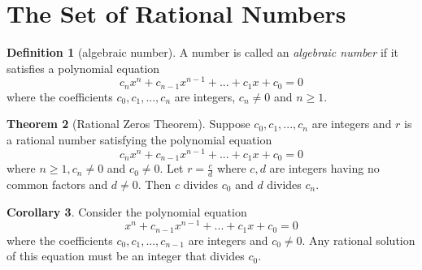 \documentclass{book}
\theoremstyle{definition}
\newtheorem{definition}{Definition}[section]
\newtheorem{theorem}[definition]{Theorem}
\newtheorem{corollary}[definition]{Corollary}
\begin{document}
\section{The Set of Rational Numbers}
\begin{definition}[algebraic number]
A number is called an \textit{algebraic number} if it satisfies a polynomial equation
\begin{equation*}
    c_nx^n + c_{n-1}x^{n-1} + ... + c_1x + c_0 = 0
\end{equation*}
where the coefficients $c_0, c_1, ..., c_n$ are integers, $c_n \neq 0$ and $n \geq 1$.
\end{definition}
\begin{theorem}[Rational Zeros Theorem]
Suppose $c_0, c_1,...,c_n$ are integers and $r$ is a rational number satisfying the polynomial equation
\begin{equation}
    c_nx^n + c_{n-1}x^{n-1} + ... + c_1x + c_0 = 0
\end{equation}
where $n \geq 1, c_n \neq 0$ and $c_0 \neq 0$. Let $r = \frac{c}{d}$ where $c,d$ are integers having no common factors and $d \neq 0$. Then $c$ divides $c_0$ and $d$ divides $c_n$.
\end{theorem}
\begin{corollary}
Consider the polynomial equation
\begin{equation*}
    x^n + c_{n-1}x^{n-1} + ... + c_1x + c_0 = 0
\end{equation*}
where the coefficients $c_0, c_1, ..., c_{n-1}$ are integers and $c_0 \neq 0$. Any rational solution of this equation must be an integer that divides $c_0$.
\end{corollary}

% 
\end{document}
